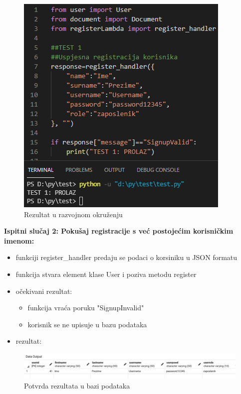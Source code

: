 			\begin{figure}[H]
				\centering
				\includegraphics[scale=0.5]{./slike/rez1.png}
				\caption{Rezultat u razvojnom okruženju}
				\label{fig:REZ1}
			\end{figure}
		
		
		\textbf{Ispitni slučaj 2: Pokušaj registracije s već postojećim korisničkim imenom:}\\
		\begin{itemize}
			\item funkciji register\_handler predaju se podaci o korsiniku u JSON formatu
			\item funkcija stvara element klase User i poziva metodu register
			
			\item očekivani rezultat:\\
			\begin{itemize}
				\item funkcija vraća poruku "SignupInvalid" 
				\item korisnik se ne upisuje u bazu podataka
			\end{itemize}
			\item rezultat:
		\end{itemize}
		\begin{figure}[H]
			\includegraphics[scale=0.5]{./slike/baza2.png}
			\caption{Potvrda rezultata u bazi podataka}
			\label{fig:REZ2}
		\end{figure}
		
